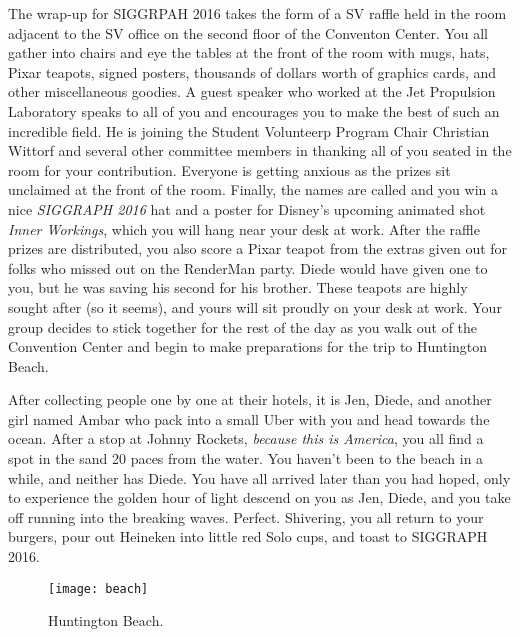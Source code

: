 \documentclass[../main.tex]{subfiles}
\begin{document}
The wrap-up for SIGGRPAH 2016 takes the form of a SV raffle held in the room adjacent to the SV office on the second floor of the Conventon Center. You all gather into chairs and eye the tables at the front of the room with mugs, hats, Pixar teapots, signed posters, thousands of dollars worth of graphics cards, and other miscellaneous goodies. A guest speaker who worked at the Jet Propulsion Laboratory speaks to all of you and encourages you to make the best of such an incredible field. He is joining the Student Volunteerp Program Chair Christian Wittorf and several other committee members in thanking all of you seated in the room for your contribution. Everyone is getting anxious as the prizes sit unclaimed at the front of the room. Finally, the names are called and you win a nice \textit{SIGGRAPH 2016} hat and a poster for Disney's upcoming animated shot \textit{Inner Workings}, which you will hang near your desk at work. After the raffle prizes are distributed, you also score a Pixar teapot from the extras given out for folks who missed out on the RenderMan party. Diede would have given one to you, but he was saving his second for his brother. These teapots are highly sought after (so it seems), and yours will sit proudly on your desk at work. Your group decides to stick together for the rest of the day as you walk out of the Convention Center and begin to make preparations for the trip to Huntington Beach.

After collecting people one by one at their hotels, it is Jen, Diede, and another girl named Ambar who pack into a small Uber with you and head towards the ocean. After a stop at Johnny Rockets, \textit{because this is America}, you all find a spot in the sand 20 paces from the water. You haven't been to the beach in a while, and neither has Diede. You have all arrived later than you had hoped, only to experience the golden hour of light descend on you as Jen, Diede, and you take off running into the breaking waves. Perfect. Shivering, you all return to your burgers, pour out Heineken into little red Solo cups, and toast to SIGGRAPH 2016.

\begin{figure}[h!]
	\centering
	\texttt{[image: beach]}
	\caption*{Huntington Beach.}
\end{figure}
\end{document}
